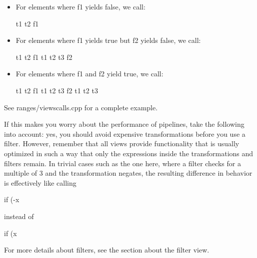 \begin{itemize}
\item
For elements where f1 yields false, we call:

\begin{cpp}
t1 t2 f1
\end{cpp}

\item
For elements where f1 yields true but f2 yields false, we call:

\begin{cpp}
t1 t2 f1 t1 t2 t3 f2
\end{cpp}

\item
For elements where f1 and f2 yield true, we call:

\begin{cpp}
t1 t2 f1 t1 t2 t3 f2 t1 t2 t3
\end{cpp}
\end{itemize}

See ranges/viewscalls.cpp for a complete example.

If this makes you worry about the performance of pipelines, take the following into account: yes, you should avoid expensive transformations before you use a filter. However, remember that all views provide functionality that is usually optimized in such a way that only the expressions inside the transformations and filters remain. In trivial cases such as the one here, where a filter checks for a multiple of 3 and the transformation negates, the resulting difference in behavior is effectively like calling

\begin{cpp}
if (-x %
\end{cpp}

instead of

\begin{cpp}
if (x %
\end{cpp}

For more details about filters, see the section about the filter view.

